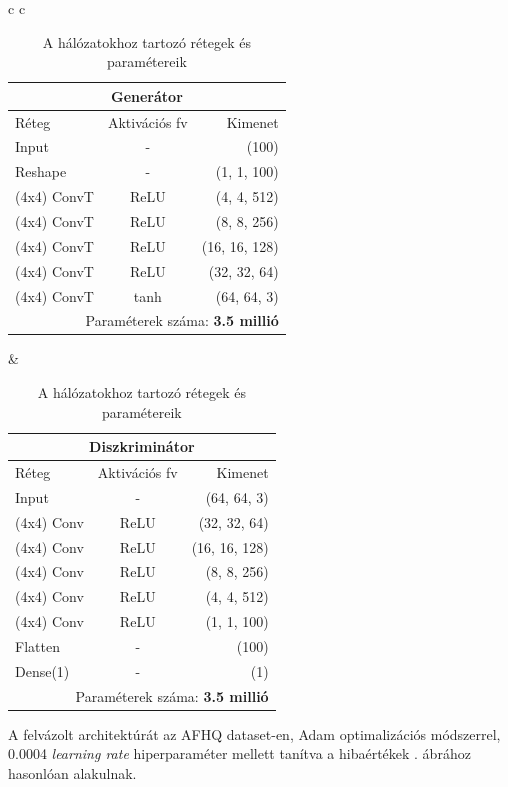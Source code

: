 \begin{table}[h!]
	\centering
\caption{A hálózatokhoz tartozó rétegek és paramétereik}
\label{tab:gen_disc_params}
\medskip
\begin{tabular}{c c}
\scriptsize{
\begin{tabular}{@{\extracolsep{5pt}} |l c r| }
	\hline
	\multicolumn{3}{|c|}{\textbf{Generátor}} \\
	\hline
	Réteg & Aktivációs fv & Kimenet\\
	\cline{1-1} \cline{2-2} \cline{3-3}
	Input & - & (100)\\
	Reshape & - & (1, 1, 100)\\
	(4x4) ConvT & ReLU & (4, 4, 512)\\
	(4x4) ConvT & ReLU & (8, 8, 256)\\
	(4x4) ConvT & ReLU & (16, 16, 128)\\
	(4x4) ConvT & ReLU & (32, 32, 64)\\
	(4x4) ConvT & tanh & (64, 64, 3)\\
	\hline
	\multicolumn{3}{|r|}{Paraméterek száma: \textbf{3.5 millió}} \\
	\hline
\end{tabular}}

&\scriptsize{
\begin{tabular}{@{\extracolsep{5pt}} |l c r| }
	\hline
	\multicolumn{3}{|c|}{\textbf{Diszkriminátor}} \\
	\hline
	Réteg & Aktivációs fv & Kimenet\\
	\cline{1-1} \cline{2-2} \cline{3-3}
	Input & - & (64, 64, 3)\\
	(4x4) Conv & ReLU & (32, 32, 64)\\
	(4x4) Conv & ReLU & (16, 16, 128)\\
	(4x4) Conv & ReLU & (8, 8, 256)\\
	(4x4) Conv & ReLU & (4, 4, 512)\\
	(4x4) Conv & ReLU & (1, 1, 100)\\
	Flatten & - & (100)\\
	Dense(1) & - & (1)\\
	\hline
	\multicolumn{3}{|r|}{Paraméterek száma: \textbf{3.5 millió}} \\
	\hline
\end{tabular}}

\end{tabular}
\end{table}


A felvázolt architektúrát az AFHQ dataset-en, Adam optimalizációs módszerrel, 0.0004 \textit{learning rate} hiperparaméter mellett tanítva a hibaértékek . ábrához hasonlóan alakulnak.

